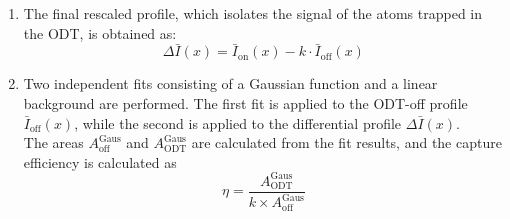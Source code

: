 \begin{enumerate}
\begin{enumerate}[label=\roman*.]
        \item A linear background $L_i(x)$ is estimated by interpolating the edges of each intensity profile.
        After subtracting the background, the integrated signal outside the ODT region is computed for both the ODT-on and ODT-off profiles ($A_{\text{on}}^{\text{out}}$ and $A_{\text{off}}^{\text{out}}$) as
        
        \begin{equation}
            A_{i}^{\text{out}} = \int_{\text{outside}} \left( \bar{I}_{i}(x) - L_{i}(x) \right) dx \qquad i \in \{\text{on, off}\}
        \end{equation}
        
        \item The normalization factor is given by the ratio of these integrated areas:
        \begin{equation}
            k = \frac{A_{\text{on}}^{\text{out}}}{A_{\text{off}}^{\text{out}}}
        \end{equation}
    \end{enumerate}

    \item The final rescaled profile, which isolates the signal of the atoms trapped in the ODT, is obtained as:
        \begin{equation}
            \Delta \bar{I}(x) = \bar{I}_{\text{on}}(x) - k \cdot \bar{I}_{\text{off}}(x)
        \end{equation}
    
    \item  Two independent fits consisting of a Gaussian function and a linear background are performed. The first fit is applied to the ODT-off profile $\bar{I}_\text{off}(x)$, while the second is applied to the differential profile $\Delta \bar{I}(x)$.\\
    The areas $A_\text{off}^\text{Gaus}$ and $A_\text{ODT}^\text{Gaus}$ are calculated from the fit results, and the capture efficiency is calculated as 
    \begin{equation}
        \eta = \frac{A_\text{ODT}^\text{Gaus}}{k \times A_\text{off}^\text{Gaus}}
    \end{equation}

\end{enumerate}